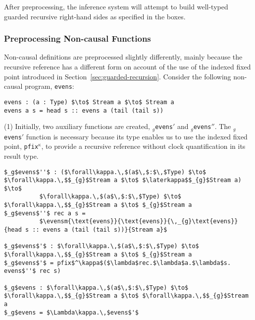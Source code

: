 After preprocessing, the inference system will attempt to build well-typed
guarded recursive right-hand sides as specified in the boxes.

\newcommand{\evens}[5]{\ensuremath{\boxed{#1;\noncausal;\phi,(#2,#3);\open;\Gamma\,\vdash\,\text{#4}\,:\,\text{#5}\,\infer
        \text{?}\,:\,\forall\kappa\,_{g}\text{#5})}}}
\newcommand{\evensm}[5]{\ensuremath{\boxed{
            \begin{matrix*}[l] #1;\causal;\phi,(#2,#3);\open;\Gamma\,\vdash \\
                           \quad\text{#4}\,:\,\text{#5}\,\infer\,\text{?}\,:\,\forall\kappa.\,_{g}\text{#5})
            \end{matrix*}
            }}}
\subsubsection{Preprocessing Non-causal Functions}
Non-causal definitions are preprocessed slightly differently, mainly because the
recursive reference has a different form on account of the use of the indexed
fixed point introduced in Section~\ref{sec:guarded-recursion}. Consider the
following non-causal program, \texttt{evens}:
\begin{lstlisting}[mathescape]
evens : (a : Type) $\to$ Stream a $\to$ Stream a
evens a s = head s :: evens a (tail (tail s))
\end{lstlisting}
(1) Initially, two auxiliary functions are created, \texttt{$_{g}$evens$'$} and
\texttt{$_{g}$evens$''$}. The \texttt{$_{g}$evens$'$} function is necessary because its type
enables us to use the indexed fixed point, \texttt{pfix$^\kappa$}, to provide a recursive reference
without clock quantification in its result type.
\begin{lstlisting}[mathescape]
$_g$evens$''$ : ($\forall\kappa.\,$(a$\,$:$\,$Type) $\to$ $\forall\kappa.\,$$_{g}$Stream a $\to$ $\laterkappa$$_{g}$Stream a) $\to$ 
          $\forall\kappa.\,$(a$\,$:$\,$Type) $\to$ $\forall\kappa.\,$$_{g}$Stream a $\to$ $_{g}$Stream a
$_g$evens$''$ rec a s = 
          $\evensm{\text{evens}}{\text{evens}}{\,_{g}\text{evens}}{head s :: evens a (tail (tail s))}{Stream a}$

$_g$evens$'$ : $\forall\kappa.\,$(a$\,$:$\,$Type) $\to$ $\forall\kappa.\,$$_{g}$Stream a $\to$ $_{g}$Stream a
$_g$evens$'$ = pfix$^\kappa$($\lambda$rec.$\lambda$a.$\lambda$s. evens$''$ rec s)

$_g$evens : $\forall\kappa.\,$(a$\,$:$\,$Type) $\to$ $\forall\kappa.\,$$_{g}$Stream a $\to$ $\forall\kappa.\,$$_{g}$Stream a
$_g$evens = $\Lambda\kappa.\,$evens$'$
\end{lstlisting}
